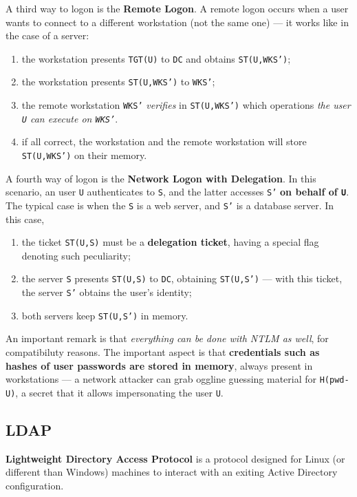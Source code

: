 \documentclass[10pt]{extreport}
\begin{document}
A third way to logon is the \textbf{Remote Logon}. A remote logon occurs when a
user wants to connect to a different workstation (not the same one) --- it works
like in the case of a server:
\begin{enumerate}
    \item the workstation presents \texttt{TGT(U)} to \texttt{DC} and obtains
        \texttt{ST(U,WKS')};
    \item the workstation presents \texttt{ST(U,WKS')} to \texttt{WKS'};
    \item the remote workstation \texttt{WKS'} \emph{verifies} in
        \texttt{ST(U,WKS')} which operations \emph{the user \texttt{U} can
        execute on \texttt{WKS'}}.
    \item if all correct, the workstation and the remote workstation will store
        \texttt{ST(U,WKS')} on their memory.
\end{enumerate}

A fourth way of logon is the \textbf{Network Logon with Delegation}. In this
scenario, an user \texttt{U} authenticates to \texttt{S}, and the latter
accesses \texttt{S'} \textbf{on behalf of \texttt{U}}. The typical case is when
the \texttt{S} is a web server, and \texttt{S'} is a database server. In this
case,
\begin{enumerate}
    \item the ticket \texttt{ST(U,S)} must be a \textbf{delegation ticket},
        having a special flag denoting such peculiarity;
    \item the server \texttt{S} presents \texttt{ST(U,S)} to \texttt{DC},
        obtaining \texttt{ST(U,S')} --- with this ticket, the server \texttt{S'}
        obtains the user's identity;
    \item both servers keep \texttt{ST(U,S')} in memory.
\end{enumerate}


An important remark is that \emph{everything can be done with NTLM as well},
for compatibiluty reasons. The important aspect is that \textbf{credentials
such as hashes of user passwords are stored in memory}, always present in
workstations --- a network attacker can grab oggline guessing material for
\texttt{H(pwd-U)}, a secret that it allows impersonating the user \texttt{U}.

\subsection{LDAP}

\textbf{Lightweight Directory Access Protocol} is a protocol designed for Linux
(or different than Windows) machines to interact with an exiting Active
Directory configuration.
\end{document}
